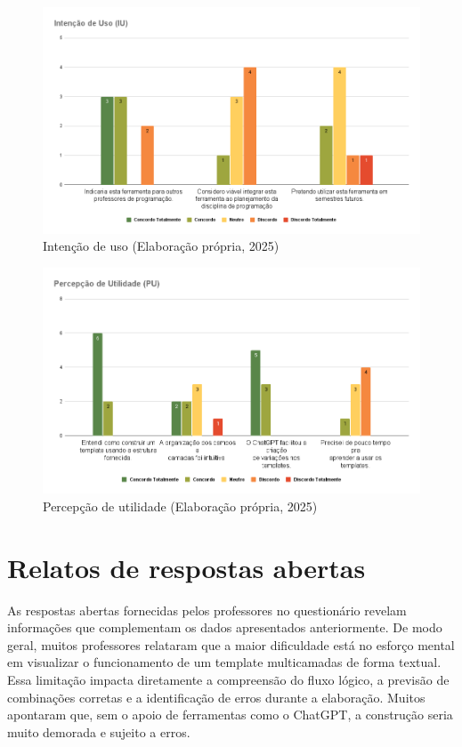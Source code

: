 \begin{figure}[ht]
	\centering
	\includegraphics[width=16cm]{./imagens/capitulo8/intencao-uso}
	\caption{Intenção de uso  (Elaboração própria, 2025) }
	\label{fig:intencao-uso}
\end{figure}



\begin{figure}[ht]
	\centering
	\includegraphics[width=16cm]{./imagens/capitulo8/percepcao-utilidade}
	\caption{Percepção de utilidade  (Elaboração própria, 2025) }
	\label{fig:percepcao-utilidade}
\end{figure}

	
\section{Relatos de respostas abertas}

As respostas abertas fornecidas pelos professores no questionário revelam  informações que complementam os dados apresentados anteriormente. De modo geral, muitos professores relataram que a maior dificuldade está no esforço mental em visualizar o funcionamento de um template multicamadas de forma textual. Essa limitação impacta diretamente a compreensão do fluxo lógico, a previsão de combinações corretas e a identificação de erros durante a elaboração. Muitos apontaram que, sem o apoio de ferramentas como o ChatGPT, a construção seria muito demorada e sujeito a erros.

